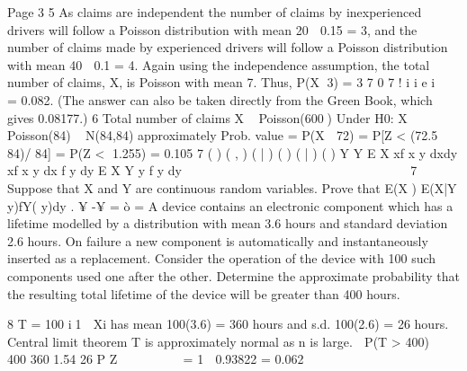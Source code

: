\documentclass[a4paper,12pt]{article}
\begin{document}
Page 3
5 As claims are independent the number of claims by inexperienced drivers will
follow a Poisson distribution with mean 20  0.15 = 3, and the number of claims
made by experienced drivers will follow a Poisson distribution with mean
40  0.1 = 4. Again using the independence assumption, the total number of
claims, X, is Poisson with mean 7.
Thus, P(X 3) =
3
7
0
7
!
i
i
e
i


 = 0.082.
(The answer can also be taken directly from the Green Book, which gives
0.08177.)
6 Total number of claims X ~ Poisson(600)
Under H0: X ~ Poisson(84) ~ N(84,84) approximately
Prob. value = P(X  72) = P[Z < (72.5  84)/	84] = P(Z < 1.255) = 0.105
7 ( ) ( , ) ( | ) ( ) ( | ) ( ) Y Y E X xf x y dxdy xf x y dx f y dy E X Y y f y dy
    
    
 
     
 
    
7 Suppose that X and Y are continuous random variables.
Prove that E(X ) E(X|Y y)fY( y)dy .
¥
-¥
= ò = 
 A device contains an electronic component which has a lifetime modelled by a
distribution with mean 3.6 hours and standard deviation 2.6 hours. On failure
a new component is automatically and instantaneously inserted as a
replacement.
Consider the operation of the device with 100 such components used one after
the other. Determine the approximate probability that the resulting total
lifetime of the device will be greater than 400 hours. 


8 T =
100
i1
 Xi has mean 100(3.6) = 360 hours
and s.d. 100(2.6) = 26 hours.
Central limit theorem 
 T is approximately normal as n is large.
 P(T > 400) 

400 360
1.54
26
P Z
  
   
 	
= 1  0.93822 = 0.062
\end{document}
